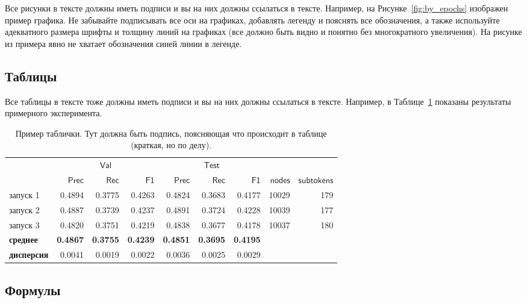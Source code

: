 \documentclass[a4paper,12pt]{extarticle}
\begin{document}
Все рисунки в тексте должны иметь подписи и вы на них должны ссылаться в тексте. Например, на Рисунке~\ref{fig:by_epochs} изображен пример графика. Не забывайте подписывать все оси на графиках, добавлять легенду и пояснять все обозначения, а также используйте адекватного размера шрифты и толщину линий на графиках (все должно быть видно и понятно без многократного увеличения). На рисунке из примера явно не хватает обозначения синей линии в легенде.


\subsection{Таблицы}

Все таблицы в тексте тоже должны иметь подписи и вы на них должны ссылаться в тексте. Например, в Таблице~\ref{table:long_epochs} показаны результаты примерного эксперимента. 


\begin{table}[ht]
	\caption{Пример таблички. Тут должна быть подпись, поясняющая что происходит в таблице (краткая, но по делу).}
	\label{table:long_epochs}
	\footnotesize
	\centering
	\begin{tabular}{lrrrrrrrr}
		\toprule
		& \multicolumn{3}{c}{$\mathsf{Val}$} &
		\multicolumn{3}{c}{$\mathsf{Test}$} \\
		\cmidrule(lr){2-4} \cmidrule(l){5-7} 
		{} &  $\mathsf{Prec}$ &  $\mathsf{Rec}$ &  $\mathsf{F1}$ &  $\mathsf{Prec}$ &  $\mathsf{Rec}$ &  $\mathsf{F1}$  &  $\mathsf{nodes}$ & $\mathsf{subtokens}$\\
		\midrule
		запуск 1    &    0.4894 &   0.3775 &  0.4263 &     0.4824 &    0.3683 &   0.4177 & 10029 & 179\\
		запуск 2    &    0.4887 &   0.3739 &  0.4237 &     0.4891 &    0.3724 &   0.4228 & 10039 & 177\\
		запуск 3    &    0.4820 &   0.3751 &  0.4219 &     0.4838 &    0.3677 &   0.4178 & 10037&	180\\
		\midrule
		\bf{среднее} &    \bf{0.4867} &   \bf{0.3755} &  \bf{0.4239} &    \bf{ 0.4851} &    \bf{0.3695} &   \bf{0.4195} \\
		\bf{дисперсия}  &    0.0041 &   0.0019 &  0.0022 &     0.0036 &    0.0025 &   0.0029 \\
		\bottomrule
	\end{tabular}
\end{table}

\subsection{Формулы}
\end{document}
